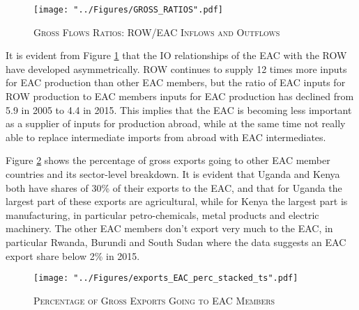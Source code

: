 \documentclass[a4paper]{article}
\begin{document}
\begin{figure}[h!]
\centering
\caption{\label{fig:GR}\textsc{Gross Flows Ratios: ROW/EAC Inflows and Outflows}}
\texttt{[image: "../Figures/GROSS\_RATIOS".pdf]} %
\end{figure}
\FloatBarrier

It is evident from Figure \ref{fig:GR} that the IO relationships of the EAC with the ROW have developed asymmetrically. ROW continues to supply 12 times more inputs for EAC production than other EAC members, but the ratio of EAC inputs for ROW production to EAC members inputs for EAC production has declined from 5.9 in 2005 to 4.4 in 2015. This implies that the EAC is becoming less important as a supplier of inputs for production abroad, while at the same time not really able to replace intermediate imports from abroad with EAC intermediates. \newline


Figure \ref{fig:exp_EAC_share} shows the percentage of gross exports going to other EAC member countries and its sector-level breakdown. It is evident that Uganda and Kenya both have shares of 30\% of their exports to the EAC, and that for Uganda the largest part of these exports are agricultural, while for Kenya the largest part is manufacturing, in particular petro-chemicals, metal products and electric machinery. The other EAC members don't export very much to the EAC, in particular Rwanda, Burundi and South Sudan where the data suggests an EAC export share below 2\% in 2015. 

\begin{figure}[h!]
\centering
\caption{\label{fig:exp_EAC_share}\textsc{Percentage of Gross Exports Going to EAC Members}}
\texttt{[image: "../Figures/exports\_EAC\_perc\_stacked\_ts".pdf]} %
\end{figure}
\FloatBarrier


\end{document}
